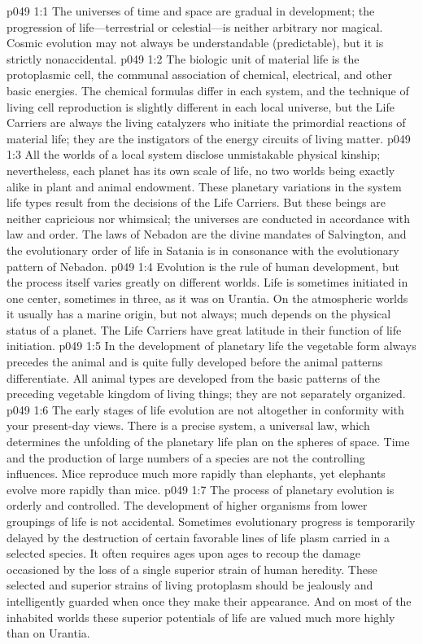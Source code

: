 \vs p049 1:1 The universes of time and space are gradual in development; the progression of life---terrestrial or celestial---is neither arbitrary nor magical. Cosmic evolution may not always be understandable (predictable), but it is strictly nonaccidental.
\vs p049 1:2 The biologic unit of material life is the protoplasmic cell, the communal association of chemical, electrical, and other basic energies. The chemical formulas differ in each system, and the technique of living cell reproduction is slightly different in each local universe, but the Life Carriers are always the living catalyzers who initiate the primordial reactions of material life; they are the instigators of the energy circuits of living matter.
\vs p049 1:3 All the worlds of a local system disclose unmistakable physical kinship; nevertheless, each planet has its own scale of life, no two worlds being exactly alike in plant and animal endowment. These planetary variations in the system life types result from the decisions of the Life Carriers. But these beings are neither capricious nor whimsical; the universes are conducted in accordance with law and order. The laws of Nebadon are the divine mandates of Salvington, and the evolutionary order of life in Satania is in consonance with the evolutionary pattern of Nebadon.
\vs p049 1:4 Evolution is the rule of human development, but the process itself varies greatly on different worlds. Life is sometimes initiated in one center, sometimes in three, as it was on Urantia. On the atmospheric worlds it usually has a marine origin, but not always; much depends on the physical status of a planet. The Life Carriers have great latitude in their function of life initiation.
\vs p049 1:5 In the development of planetary life the vegetable form always precedes the animal and is quite fully developed before the animal patterns differentiate. All animal types are developed from the basic patterns of the preceding vegetable kingdom of living things; they are not separately organized.
\vs p049 1:6 The early stages of life evolution are not altogether in conformity with your present\hyp{}day views.  There is a precise system, a universal law, which determines the unfolding of the planetary life plan on the spheres of space. Time and the production of large numbers of a species are not the controlling influences. Mice reproduce much more rapidly than elephants, yet elephants evolve more rapidly than mice.
\vs p049 1:7 The process of planetary evolution is orderly and controlled. The development of higher organisms from lower groupings of life is not accidental. Sometimes evolutionary progress is temporarily delayed by the destruction of certain favorable lines of life plasm carried in a selected species. It often requires ages upon ages to recoup the damage occasioned by the loss of a single superior strain of human heredity. These selected and superior strains of living protoplasm should be jealously and intelligently guarded when once they make their appearance. And on most of the inhabited worlds these superior potentials of life are valued much more highly than on Urantia.

